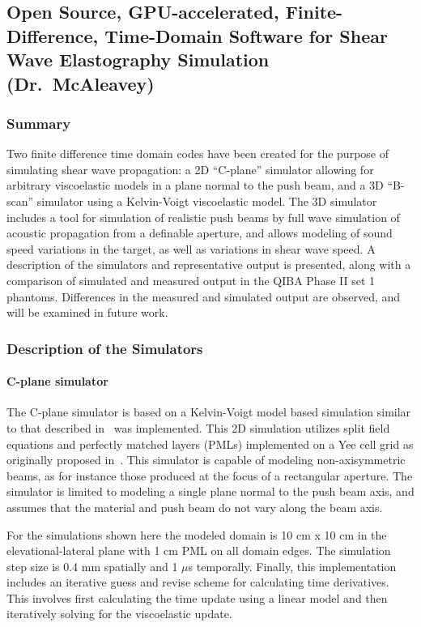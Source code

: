 \subsection{Open Source, GPU-accelerated, Finite-Difference, Time-Domain
    Software for Shear Wave Elastography Simulation (Dr.\ McAleavey)}

\subsubsection{Summary}
Two finite difference time domain codes have been created for the purpose of
simulating shear wave propagation: a 2D ``C-plane'' simulator allowing for
arbitrary viscoelastic models in a plane normal to the push beam, and a 3D
``B-scan'' simulator using a Kelvin-Voigt viscoelastic model. The 3D simulator
includes a tool for simulation of realistic push beams by full wave simulation
of acoustic propagation from a definable aperture, and allows modeling of sound
speed variations in the target, as well as variations in shear wave speed. A
description of the simulators and representative output is presented, along
with a comparison of simulated and measured output in the QIBA Phase II set 1
phantoms. Differences in the measured and simulated output are observed, and
will be examined in future work. 

\subsubsection{Description of the Simulators}

\paragraph{C-plane simulator}
The C-plane simulator is based on a Kelvin-Voigt model based simulation similar
to that described in~\cite{Orescanin2011} was implemented. This 2D simulation
utilizes split field equations and perfectly matched layers (PMLs) implemented
on a Yee cell grid as originally proposed in~\cite{Berenger1994}. This
simulator is capable of modeling non-axisymmetric beams, as for instance those
produced at the focus of a rectangular aperture. The simulator is limited to
modeling a single plane normal to the push beam axis, and assumes that the
material and push beam do not vary along the beam axis. 

For the simulations shown here the modeled domain is 10 cm x 10 cm in the
elevational-lateral plane with 1 cm PML on all domain edges. The simulation
step size is 0.4 mm spatially and 1 $\mu$s temporally. Finally, this
implementation includes an iterative guess and revise scheme for calculating
time derivatives.  This involves first calculating the time update using a
linear model and then iteratively solving for the viscoelastic update. 


